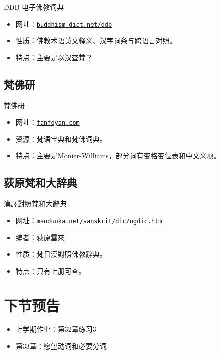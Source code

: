 \documentclass[17pt]{beamer}
\newcommand{\dicturl}[2]{\href{#1}{\mbox{\texttt{#2}}}}
\begin{document}
\begin{frame}{DDB 电子佛教词典}
  \small
  \begin{itemize}
    \item 网址：\dicturl{https://www.buddhism-dict.net/ddb/}{buddhism-dict.net/ddb}
    \item 性质：佛教术语英文释义、汉字词条与跨语言对照。
    \item 特点：主要是以汉查梵？
  \end{itemize}
\end{frame}


\subsection{梵佛研}
\begin{frame}{梵佛研}
  \small
  \begin{itemize}
    \item 网址：\dicturl{https://fanfoyan.com/}{fanfoyan.com}
    \item 资源：梵语宝典和梵佛词典。
    \item 特点：主要是Monier-Williams，部分词有变格变位表和中文义项。
  \end{itemize}
\end{frame}

\subsection{荻原梵和大辞典}
\begin{frame}{漢譯對照梵和大辭典}
  \small
  \begin{itemize}
    \item 网址：\dicturl{https://www.manduuka.net/sanskrit/dic/ogdic.htm}{manduuka.net/sanskrit/dic/ogdic.htm}
    \item 编者：荻原雲來
    \item 性质：梵日漢對照佛教辭典。
    \item 特点：只有上册可查。
  \end{itemize}
\end{frame}

\section{下节预告}

\begin{frame}{\insertsection }
  \begin{itemize}
    \item 上学期作业：第32章练习3
    \item 第33章：愿望动词和必要分词
  \end{itemize}
\end{frame}  
\end{document}
